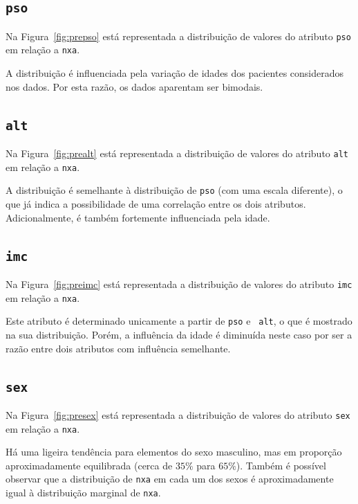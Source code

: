 \documentclass[10pt, conference, compsocconf]{IEEEtran}
\begin{document}
\subsection{\texttt{pso}}
Na Figura~\ref{fig:prepso} está representada a distribuição de valores
do atributo {\tt pso} em relação a {\tt nxa}.


A distribuição é influenciada pela variação de idades dos pacientes
considerados nos dados. Por esta razão, os dados aparentam ser
bimodais.

\subsection{\texttt{alt}}
Na Figura~\ref{fig:prealt} está representada a distribuição de valores
do atributo {\tt alt} em relação a {\tt nxa}.


A distribuição é semelhante à distribuição de {\tt pso} (com uma
escala diferente), o que já indica a possibilidade de uma correlação
entre os dois atributos. Adicionalmente, é também fortemente
influenciada pela idade.

\subsection{\texttt{imc}}
Na Figura~\ref{fig:preimc} está representada a distribuição de valores
do atributo {\tt imc} em relação a {\tt nxa}.


Este atributo é determinado unicamente a partir de {\tt pso} e {\tt
  alt}, o que é mostrado na sua distribuição. Porém, a influência da
idade é diminuída neste caso por ser a razão entre dois atributos com
influência semelhante.

\subsection{\texttt{sex}}
Na Figura~\ref{fig:presex} está representada a distribuição de valores
do atributo {\tt sex} em relação a {\tt nxa}.


Há uma ligeira tendência para elementos do sexo masculino, mas em
proporção aproximadamente equilibrada (cerca de $35\%$ para
$65\%$). Também é possível observar que a distribuição de {\tt nxa} em
cada um dos sexos é aproximadamente igual à distribuição marginal de
{\tt nxa}.
\end{document}
